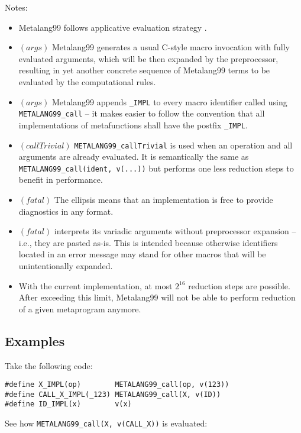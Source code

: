 \documentclass[12pt]{article}
\theoremstyle{break}
\begin{document}
Notes:

\begin{itemize}
    \item Metalang99 follows applicative evaluation strategy \cite{ApplicativeEvaluationStrategy}.

    \item $(args)$ Metalang99 generates a usual C-style macro invocation with
    fully evaluated arguments, which will be then expanded by the preprocessor, resulting
    in yet another concrete sequence of Metalang99 terms to be evaluated by the computational
    rules.
    \item $(args)$ Metalang99 appends \texttt{\_IMPL} to every macro identifier called using
    \texttt{METALANG99\_call} -- it makes easier to follow the convention that all implementations
    of metafunctions shall have the postfix \texttt{\_IMPL}.
    \item $(callTrivial)$ \texttt{METALANG99\_callTrivial} is used when an operation and all
    arguments are already evaluated. It is semantically the same as \texttt{METALANG99\_call(ident, v(...))}
    but performs one less reduction steps to benefit in performance.
    \item $(fatal)$ The ellipsis means that an implementation is free to provide
    diagnostics in any format.
    \item $(fatal)$ interprets its variadic arguments without preprocessor expansion -- i.e.,
    they are pasted as-is. This is intended because otherwise identifiers located in an
    error message may stand for other macros that will be unintentionally expanded.
    \item With the current implementation, at most $2^{16}$ reduction steps are
    possible. After exceeding this limit, Metalang99 will not be able to perform reduction
    of a given metaprogram anymore.
\end{itemize}

\subsection{Examples}

Take the following code:

\begin{verbatim}
#define X_IMPL(op)        METALANG99_call(op, v(123))
#define CALL_X_IMPL(_123) METALANG99_call(X, v(ID))
#define ID_IMPL(x)        v(x)
\end{verbatim}

See how \texttt{METALANG99\_call(X, v(CALL\_X))} is evaluated:
\end{document}
